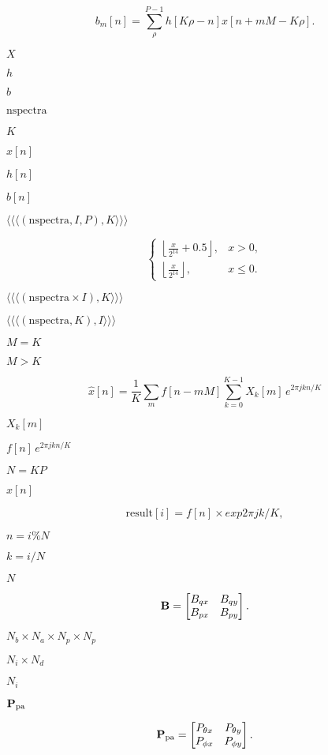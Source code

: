 \documentclass{article}
\begin{document}
\[ b_m[n] = \sum_\rho^{P-1} h[K\rho - n] x[n + mM - K\rho]. \]
\pagebreak

$X$
\pagebreak

$h$
\pagebreak

$b$
\pagebreak

$\text{nspectra}$
\pagebreak

$K$
\pagebreak

$x[n]$
\pagebreak

$h[n]$
\pagebreak

$b[n]$
\pagebreak

$ \langle\langle\langle (\text{nspectra},I,P), K \rangle\rangle\rangle $
\pagebreak

\[ \begin{cases} \left\lfloor \frac{x}{2^{14}} + 0.5 \right\rfloor, & x > 0, \\ \left\lfloor \frac{x}{2^{14}} \right\rfloor, & x \le 0. \end{cases} \]
\pagebreak

$\langle\langle\langle (\text{nspectra} \times I), K \rangle\rangle\rangle$
\pagebreak

$\langle\langle\langle(\text{nspectra},K),I\rangle\rangle\rangle$
\pagebreak

$M = K$
\pagebreak

$M > K$
\pagebreak

\[ \hat{x}[n] = \frac{1}{K} \sum_m f[n - mM] \sum_{k=0}^{K-1} X_k[m]\,e^{2\pi jkn/K} \]
\pagebreak

$X_k[m]$
\pagebreak

$f[n]\,e^{2\pi jkn/K}$
\pagebreak

$N = KP$
\pagebreak

$\hat{x}[n]$
\pagebreak

\[ \text{result}[i] = f[n] \times exp{2\pi jk/K}, \]
\pagebreak

$n = i \% N$
\pagebreak

$k = i / N$
\pagebreak

$N$
\pagebreak

\[ {\bf B} = \begin{bmatrix} B_{qx} & B_{qy} \\ B_{px} & B_{py} \end{bmatrix}. \]
\pagebreak

$N_b \times N_a \times N_p \times N_p$
\pagebreak

$N_i \times N_d$
\pagebreak

$N_i$
\pagebreak

${\bf P}_\text{pa}$
\pagebreak

\[ {\bf P}_\text{pa} = \begin{bmatrix} P_{\theta x} & P_{\theta y} \\ P_{\phi x} & P_{\phi y} \end{bmatrix}. \]
\pagebreak
\end{document}
